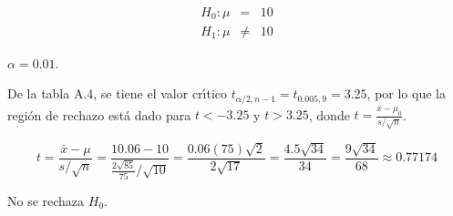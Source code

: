 \begin{solucion}
 \begin{hipotesis}
  \begin{eqnarray*}
   H_0: \mu & = & 10 \\
   H_1: \mu & \neq & 10
  \end{eqnarray*}
 \end{hipotesis}

 \begin{significancia}
  $\alpha = 0.01$.
 \end{significancia}

 \begin{region}
  De la tabla A.4, se tiene el valor cr\'{\i}tico $t_{\alpha/2,n-1} = t_{0.005,9} = 3.25$, por lo que la regi\'on de rechazo est\'a dado para $t < -3.25$ y $t > 3.25$, donde $t = \frac{\bar{x} - \mu_0}{s/\sqrt{n}}$.
 \end{region}

 \begin{estadistico}
  \begin{equation*}
   t = \frac{\bar{x} - \mu}{s/\sqrt{n}} = \frac{10.06-10}{\frac{2\sqrt{85}}{75} / \sqrt{10}} = \frac{0.06(75)\sqrt{2}}{2\sqrt{17}} = \frac{4.5\sqrt{34}}{34} = \frac{9\sqrt{34}}{68} \approx 0.77174
  \end{equation*}
 \end{estadistico}

 \begin{decision}
  No se rechaza $H_0$.
 \end{decision}


\end{solucion}

